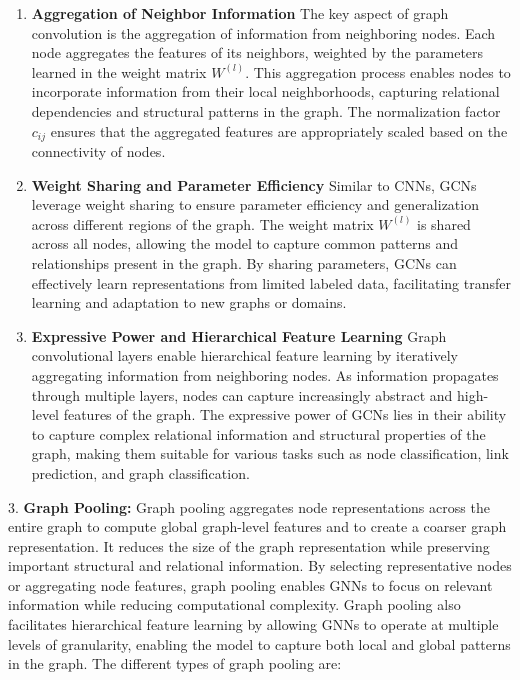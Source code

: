 \begin{enumerate}

\item \textbf{Aggregation of Neighbor Information}
The key aspect of graph convolution is the aggregation of information from neighboring nodes. Each node aggregates the features of its neighbors, weighted by the parameters learned in the weight matrix $W^{(l)}$. This aggregation process enables nodes to incorporate information from their local neighborhoods, capturing relational dependencies and structural patterns in the graph. The normalization factor $c_{ij}$ ensures that the aggregated features are appropriately scaled based on the connectivity of nodes.

\item \textbf{Weight Sharing and Parameter Efficiency}
Similar to CNNs, GCNs leverage weight sharing to ensure parameter efficiency and generalization across different regions of the graph. The weight matrix $W^{(l)}$ is shared across all nodes, allowing the model to capture common patterns and relationships present in the graph. By sharing parameters, GCNs can effectively learn representations from limited labeled data, facilitating transfer learning and adaptation to new graphs or domains.

\item \textbf{Expressive Power and Hierarchical Feature Learning}
Graph convolutional layers enable hierarchical feature learning by iteratively aggregating information from neighboring nodes. As information propagates through multiple layers, nodes can capture increasingly abstract and high-level features of the graph. The expressive power of GCNs lies in their ability to capture complex relational information and structural properties of the graph, making them suitable for various tasks such as node classification, link prediction, and graph classification.

\end{enumerate}
3. \textbf{Graph Pooling:}
Graph pooling aggregates node representations across the entire graph to compute global graph-level features and to create a coarser graph representation.
It reduces the size of the graph representation while preserving important structural and relational information. By selecting representative nodes or aggregating node features, graph pooling enables GNNs to focus on relevant information while reducing computational complexity. Graph pooling also facilitates hierarchical feature learning by allowing GNNs to operate at multiple levels of granularity, enabling the model to capture both local and global patterns in the graph. The different types of graph pooling are: 

